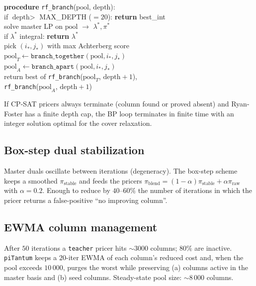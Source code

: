 \begin{schemabox}[title={Pseudocode -- Ryan-Foster recursive tree}]
\sffamily\small
\textbf{procedure} \texttt{rf\_branch}($\text{pool}$, $\text{depth}$):\\
\hphantom{XX} if $\text{depth} > $ MAX\_DEPTH ($=20$): \textbf{return} best\_int\\
\hphantom{XX} solve master LP on $\text{pool}$ $\to$ $\lambda^*, \pi^*$\\
\hphantom{XX} if $\lambda^*$ integral: \textbf{return} $\lambda^*$\\
\hphantom{XX} pick $(i_*, j_*)$ with max Achterberg score\\
\hphantom{XX} $\text{pool}_T \gets \texttt{branch\_together}(\text{pool}, i_*, j_*)$\\
\hphantom{XX} $\text{pool}_A \gets \texttt{branch\_apart}(\text{pool}, i_*, j_*)$\\
\hphantom{XX} return best of \texttt{rf\_branch}($\text{pool}_T$, $\text{depth}+1$),\\
\hphantom{XXXX} \texttt{rf\_branch}($\text{pool}_A$, $\text{depth}+1$)
\end{schemabox}

\begin{theorem}
If CP-SAT pricers always terminate (column found or proved
absent) and Ryan-Foster has a finite depth cap, the BP loop
terminates in finite time with an integer solution optimal for
the cover relaxation.
\end{theorem}

\subsection{Box-step dual stabilization}

Master duals oscillate between iterations (degeneracy). The
box-step scheme keeps a smoothed
$\pi_{\text{stable}}$ and feeds the pricers
$\pi_{\text{blend}} = (1-\alpha)\pi_{\text{stable}} +
\alpha \pi_{\text{raw}}$ with $\alpha = 0.2$. Enough to reduce
by $40$--$60\%$ the number of iterations in which the pricer
returns a false-positive ``no improving column''.

\subsection{EWMA column management}

After $50$ iterations a \texttt{teacher} pricer hits
$\sim 3000$ columns; $80\%$ are inactive. \texttt{piTantum}
keeps a $20$-iter EWMA of each column's reduced cost and, when
the pool exceeds $10\,000$, purges the worst while preserving
(a) columns active in the master basis and (b) seed columns.
Steady-state pool size: $\sim 8\,000$ columns.

